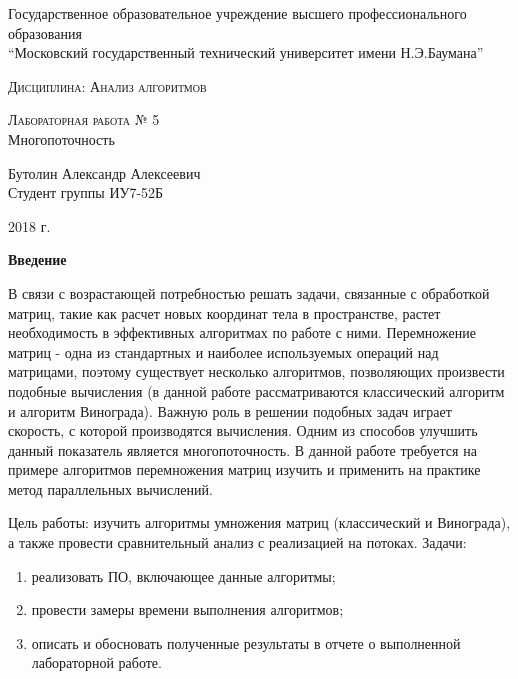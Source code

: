 \documentclass[12pt,a4paper]{scrartcl}
\begin{document}
	\begin{titlepage}
		\begin{center}
			\large
			Государственное образовательное учреждение высшего профессионального образования\\
			“Московский государственный технический университет имени Н.Э.Баумана”
			\vspace{0.25cm}
			
			
			\textsc{Дисциплина: Анализ алгоритмов}\\[5mm]
			\vfill
			
			\textsc{Лабораторная работа № 5}\\[5mm]
			
			{\large Многопоточность}
			\bigskip
			
			
			Бутолин Александр Алексеевич\\
			Студент группы ИУ7-52Б
			\vfill		
			
		\end{center}
		\begin{center}
			2018 г.
		\end{center}
	\end{titlepage}
	
	
	\begin{center}
		\textbf{Введение}
		\label{sec:intro}
    \end{center}

    В связи с возрастающей потребностью решать задачи, связанные с обработкой матриц, такие как расчет новых координат тела в пространстве, растет необходимость в эффективных алгоритмах по работе с ними. 
	Перемножение матриц - одна из стандартных и наиболее используемых операций над матрицами, поэтому существует несколько алгоритмов, позволяющих произвести подобные вычисления (в данной работе рассматриваются классический алгоритм и алгоритм Винограда).
	Важную роль в решении подобных задач играет скорость, с которой производятся вычисления.
	Одним из способов улучшить данный показатель является многопоточность.
	В данной работе требуется на примере алгоритмов перемножения матриц изучить и применить на практике метод параллельных вычислений.
	
	Цель работы: изучить алгоритмы умножения матриц (классический и Винограда), а также провести сравнительный анализ с реализацией на потоках. 	
	Задачи: 
	
	\begin{enumerate}
		\item {реализовать ПО, включающее данные алгоритмы;} 
		\item {провести замеры времени выполнения алгоритмов;} 
		\item {описать и обосновать полученные результаты в отчете о выполненной лабораторной работе.}
    \end{enumerate}
    
\end{document}
